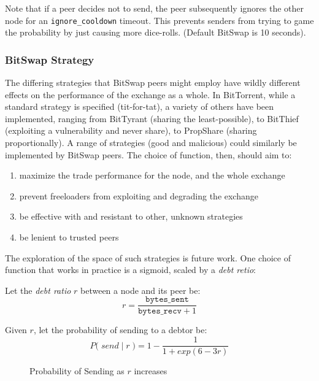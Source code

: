 \documentclass{sig-alternate}
\begin{document}
Note that if a peer decides not to send, the peer subsequently ignores the
other node for an \texttt{ignore\_cooldown} timeout. This prevents senders
from trying to game the probability by just causing more dice-rolls.
(Default BitSwap is 10 seconds).

\subsubsection{BitSwap Strategy}

The differing strategies that BitSwap peers might employ have wildly different effects on the performance of the exchange as a whole. In BitTorrent, while a standard strategy is specified (tit-for-tat), a variety of others have been implemented, ranging from BitTyrant \cite{BitTyrant} (sharing the least-possible), to BitThief \cite{BitThief} (exploiting a vulnerability and never share), to PropShare \cite{PropShare} (sharing proportionally). A range of strategies (good and malicious) could similarly be implemented by BitSwap peers. The choice of function, then, should aim to:

\begin{enumerate}
  \item maximize the trade performance for the node, and the whole exchange
  \item prevent freeloaders from exploiting and degrading the exchange
  \item be effective with and resistant to other, unknown
  strategies
  \item be lenient to trusted peers
\end{enumerate}

The exploration of the space of such strategies is future work.
One choice of function that works in practice is a sigmoid, scaled by a
\textit{debt retio}:

Let the \textit{debt ratio} $ r $ between a node and its peer be:
  \[ r = \dfrac{\texttt{bytes\_sent}}{\texttt{bytes\_recv} + 1} \]

Given $r$, let the probability of sending to a debtor be:
  \[ P\Big( \; send \; | \; r \;\Big) = 1 - \dfrac{1}{1 + exp(6-3r)} \]

\begin{figure}
\centering
{}
\caption{Probability of Sending as $r$ increases}
\label{fig:psending-graph}
\end{figure}
\end{document}
